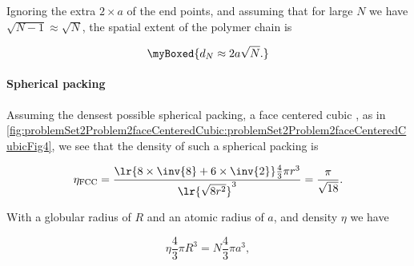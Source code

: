 {Ignoring the extra $2 \times a$ of the end points, and assuming that for large $N$ we have $\sqrt{N-1} \approx \sqrt{N}$, the spatial extent of the polymer chain is

\begin{equation}\label{eqn:basicStatMechProblemSet3Problem2:140}
\myBoxed{
d_N \approx 2 a \sqrt{N}.
}
\end{equation}

%

\paragraph{Spherical packing}

Assuming the densest possible spherical packing, a face centered cubic \citep{wiki:spherePacking}, as in \cref{fig:problemSet2Problem2faceCenteredCubic:problemSet2Problem2faceCenteredCubicFig4}, we see that the density of such a spherical packing is


\begin{equation}\label{eqn:basicStatMechProblemSet3Problem2:160}
\eta_{\mathrm{FCC}} =
\frac{\lr{8 \times \inv{8} + 6 \times \inv{2} } \frac{4}{3} \pi r^3}{ \lr{ \sqrt{8 r^2} }^3 }
= 
\frac{\pi}{\sqrt{18}}.
\end{equation}

With a globular radius of $R$ and an atomic radius of $a$, and density $\eta$ we have

\begin{equation}\label{eqn:basicStatMechProblemSet3Problem2:200}
\eta \frac{4}{3} \pi R^3 = N \frac{4}{3} \pi a^3,
\end{equation}

}
